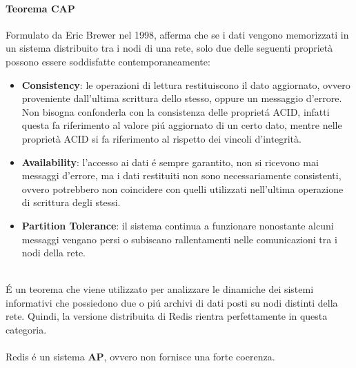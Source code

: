 \paragraph{Teorema CAP\\}
Formulato da Eric Brewer nel 1998, afferma che se i dati vengono memorizzati in un sistema distribuito tra i nodi di una rete, solo due delle seguenti
proprietà possono essere soddisfatte contemporaneamente:
\begin{itemize}
    \item \textbf{Consistency}: le operazioni di lettura restituiscono il dato aggiornato, ovvero proveniente dall'ultima scrittura dello stesso,
    oppure un messaggio d'errore. Non bisogna confonderla con la consistenza delle proprietá ACID, infatti questa fa riferimento al valore piú aggiornato
    di un certo dato, mentre nelle proprietà ACID si fa riferimento al rispetto dei vincoli d'integrità.
    \item \textbf{Availability}: l'accesso ai dati é sempre garantito, non si ricevono mai messaggi d'errore, ma i dati restituiti non sono necessariamente
    consistenti, ovvero potrebbero non coincidere con quelli utilizzati nell'ultima operazione di scrittura degli stessi.
    \item \textbf{Partition Tolerance}: il sistema continua a funzionare nonostante alcuni messaggi vengano persi o subiscano rallentamenti
    nelle comunicazioni tra i nodi della rete.
\end{itemize}
\\
É un teorema che viene utilizzato per analizzare le dinamiche dei sistemi informativi che possiedono due o piú archivi di dati posti su
nodi distinti della rete. Quindi, la versione distribuita di Redis rientra perfettamente in questa categoria.\\
\\
Redis é un sistema \textbf{AP}, ovvero non fornisce una forte coerenza.
